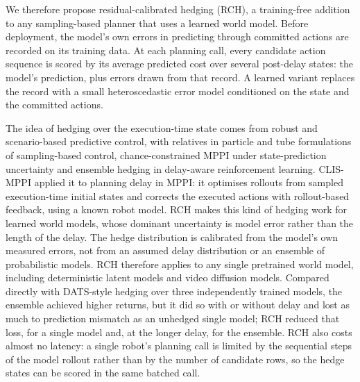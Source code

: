 \documentclass[pdflatex,sn-nature]{sn-jnl}%
\begin{document}
We therefore propose residual-calibrated hedging (RCH), a training-free addition to any sampling-based planner that uses a learned world model. Before deployment, the model's own errors in predicting through committed actions are recorded on its training data. At each planning call, every candidate action sequence is scored by its average predicted cost over several post-delay states: the model's prediction, plus errors drawn from that record. A learned variant replaces the record with a small heteroscedastic error model conditioned on the state and the committed actions.

The idea of hedging over the execution-time state comes from robust and scenario-based predictive control\cite{calafiore2006scenario,lucia2013multistage}, with relatives in particle and tube formulations of sampling-based control\cite{dyro2021particle,gandhi2021robust}, chance-constrained MPPI under state-prediction uncertainty\cite{serfling2026ccmppi} and ensemble hedging in delay-aware reinforcement learning\cite{chen2020dats}. CLIS-MPPI\cite{liu2026clis} applied it to planning delay in MPPI: it optimises rollouts from sampled execution-time initial states and corrects the executed actions with rollout-based feedback, using a known robot model. RCH makes this kind of hedging work for learned world models, whose dominant uncertainty is model error rather than the length of the delay. The hedge distribution is calibrated from the model's own measured errors, not from an assumed delay distribution or an ensemble of probabilistic models\cite{chua2018pets,chen2020dats}. RCH therefore applies to any single pretrained world model, including deterministic latent models and video diffusion models. Compared directly with DATS-style hedging over three independently trained models, the ensemble achieved higher returns, but it did so with or without delay and lost as much to prediction mismatch as an unhedged single model; RCH reduced that loss, for a single model and, at the longer delay, for the ensemble. RCH also costs almost no latency: a single robot's planning call is limited by the sequential steps of the model rollout rather than by the number of candidate rows, so the hedge states can be scored in the same batched call.
\end{document}
